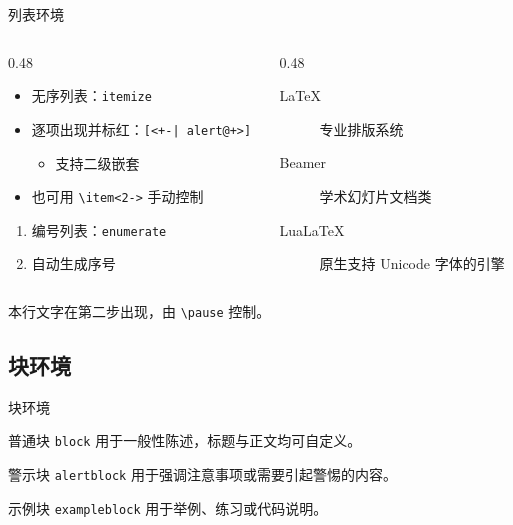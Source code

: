 \documentclass[aspectratio=169]{beamer}
\begin{document}
\begin{frame}{列表环境}
    \begin{columns}[t]
        \begin{column}{0.48\textwidth}
            \begin{itemize}[<+-| alert@+>]
                \item 无序列表：\texttt{itemize}
                \item 逐项出现并标红：\texttt{[<+-| alert@+>]}
                      \begin{itemize}
                          \item 支持二级嵌套
                      \end{itemize}
                \item 也可用 \texttt{\textbackslash item<2->} 手动控制
            \end{itemize}
            \begin{enumerate}
                \item 编号列表：\texttt{enumerate}
                \item 自动生成序号
            \end{enumerate}
        \end{column}
        \begin{column}{0.48\textwidth}
            \begin{description}
                \item[LaTeX] 专业排版系统
                \item[Beamer] 学术幻灯片文档类
                \item[LuaLaTeX] 原生支持 Unicode 字体的引擎
            \end{description}
        \end{column}
    \end{columns}
    \vspace{1em}
    \pause
    本行文字在第二步出现，由 \texttt{\textbackslash pause} 控制。
\end{frame}

\subsection{块环境}

\begin{frame}{块环境}
    \begin{block}{普通块 \texttt{block}}
        用于一般性陈述，标题与正文均可自定义。
    \end{block}
    \begin{alertblock}{警示块 \texttt{alertblock}}
        用于强调注意事项或需要引起警惕的内容。
    \end{alertblock}
    \begin{exampleblock}{示例块 \texttt{exampleblock}}
        用于举例、练习或代码说明。
    \end{exampleblock}
\end{frame}
\end{document}
